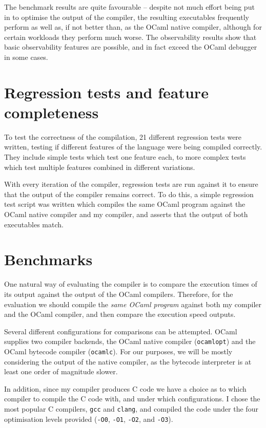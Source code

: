 The benchmark results are quite favourable -- despite not much effort being put
in to optimise the output of the compiler, the resulting executables frequently
perform as well as, if not better than, as the OCaml native compiler, although
for certain workloads they perform much worse. The observability results show
that basic observability features are possible, and in fact exceed the OCaml
debugger in some cases.

\section{Regression tests and feature completeness}\label{regression-tests}

To test the correctness of the compilation, 21 different regression tests were
written, testing if different features of the language were being compiled
correctly. They include simple tests which test one feature each, to more
complex tests which test multiple features combined in different variations.

With every iteration of the compiler, regression tests are run against it to 
ensure that the output of the compiler remains correct. To do this, a simple 
regression test script was written which compiles the same OCaml program 
against the OCaml native compiler and my compiler, and asserts that the output 
of both executables match.

\section{Benchmarks}\label{benchmarks}

One natural way of evaluating the compiler is to compare the execution times of
its output against the output of the OCaml compilers. Therefore, for the
evaluation we should compile the \emph{same OCaml program} against both my
compiler and the OCaml compiler, and then compare the execution speed outputs.

Several different configurations for comparisons can be attempted. OCaml
supplies two compiler backends, the OCaml native compiler (\texttt{ocamlopt})
and the OCaml bytecode compiler (\texttt{ocamlc}). For our purposes, we will be
mostly considering the output of the native compiler, as the bytecode
interpreter is at least one order of magnitude slower.

In addition, since my compiler produces C code we have a choice as to which
compiler to compile the C code with, and under which configurations. I chose the
most popular C compilers, \texttt{gcc} and \texttt{clang}, and compiled the code
under the four optimisation levels provided (\texttt{-O0}, \texttt{-O1},
\texttt{-O2}, and \texttt{-O3}).

